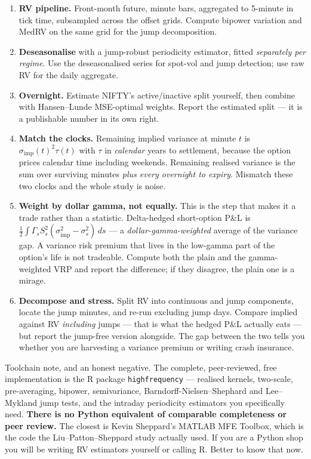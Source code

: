 \documentclass[11pt,a4paper]{article}
\newcommand{\srcnote}[1]{{\footnotesize\color{soft}#1\par}}
\begin{document}
\begin{enumerate}
\item \textbf{RV pipeline.} Front-month future, minute bars, aggregated to 5-minute
in tick time, subsampled across the offset grids. Compute bipower variation and
MedRV on the same grid for the jump decomposition.
\item \textbf{Deseasonalise} with a jump-robust periodicity estimator, fitted
\emph{separately per regime}. Use the deseasonalised series for spot-vol and jump
detection; use raw RV for the daily aggregate.
\item \textbf{Overnight.} Estimate NIFTY's active/inactive split yourself, then
combine with Hansen--Lunde MSE-optimal weights. Report the estimated split --- it
is a publishable number in its own right.
\item \textbf{Match the clocks.} Remaining implied variance at minute $t$ is
$\sigma_{\text{imp}}(t)^2 \tau(t)$ with $\tau$ in \emph{calendar} years to
settlement, because the option prices calendar time including weekends. Remaining
realised variance is the sum over surviving minutes \emph{plus every overnight to
expiry}. Mismatch these two clocks and the whole study is noise.
\item \textbf{Weight by dollar gamma, not equally.} This is the step that makes it
a trade rather than a statistic. Delta-hedged short-option P\&L is
$\tfrac{1}{2}\int \Gamma_s S_s^2 (\sigma_{\text{imp}}^2 - \sigma_s^2)\,ds$ --- a
\emph{dollar-gamma-weighted} average of the variance gap. A variance risk premium
that lives in the low-gamma part of the option's life is not tradeable. Compute
both the plain and the gamma-weighted VRP and report the difference; if they
disagree, the plain one is a mirage.
\item \textbf{Decompose and stress.} Split RV into continuous and jump components,
locate the jump minutes, and re-run excluding jump days. Compare implied against
RV \emph{including} jumps --- that is what the hedged P\&L actually eats --- but
report the jump-free version alongside. The gap between the two tells you whether
you are harvesting a variance premium or writing crash insurance.
\end{enumerate}

\srcnote{Toolchain note, and an honest negative. The complete, peer-reviewed, free
implementation is the R package \texttt{highfrequency} --- realised kernels,
two-scale, pre-averaging, bipower, semivariance, Barndorff-Nielsen--Shephard and
Lee--Mykland jump tests, and the intraday periodicity estimators you specifically
need. \textbf{There is no Python equivalent of comparable completeness or peer
review.} The closest is Kevin Sheppard's MATLAB MFE Toolbox, which is the code the
Liu--Patton--Sheppard study actually used. If you are a Python shop you will be
writing RV estimators yourself or calling R. Better to know that now.}
\end{document}
